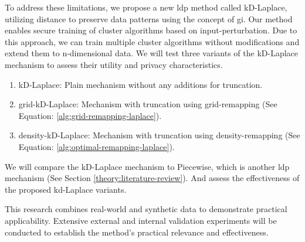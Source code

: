 To address these limitations, we propose a new \gls{ldp} method called kD-Laplace, utilizing distance to preserve data patterns using the concept of \gls{gi}. \newline
Our method enables secure training of cluster algorithms based on input-perturbation.
Due to this approach, we can train multiple cluster algorithms without modifications and extend them to n-dimensional data.
We will test three variants of the kD-Laplace mechanism to assess their utility and privacy characteristics.
\begin{enumerate}
  \item kD-Laplace: Plain mechanism without any additions for truncation.
  \item grid-kD-Laplace: Mechanism with truncation using grid-remapping (See Equation: \ref{alg:grid-remapping-laplace}).
  \item density-kD-Laplace: Mechanism with truncation using density-remapping (See Equation: \ref{alg:optimal-remapping-laplace}).
\end{enumerate}
We will compare the kD-Laplace mechanism to Piecewise, which is another \gls{ldp} mechanism (See Section \ref{theory:literature-review}).
And assess the effectiveness of the proposed kd-Laplace variants.

This research combines real-world and synthetic data to demonstrate practical applicability.
Extensive external and internal validation experiments will be conducted to establish the method's practical relevance and effectiveness.


